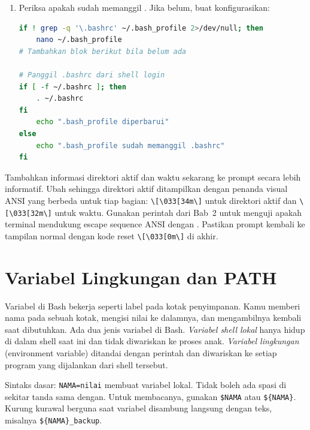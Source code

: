 \begin{enumerate}
    \item Periksa apakah  sudah memanggil
          . Jika belum, buat konfigurasikan:
\begin{lstlisting}[language=bash, caption={Memastikan .bash\_profile memanggil .bashrc}]
if ! grep -q '\.bashrc' ~/.bash_profile 2>/dev/null; then
    nano ~/.bash_profile
# Tambahkan blok berikut bila belum ada

# Panggil .bashrc dari shell login
if [ -f ~/.bashrc ]; then
    . ~/.bashrc
fi
    echo ".bash_profile diperbarui"
else
    echo ".bash_profile sudah memanggil .bashrc"
fi
\end{lstlisting}
\end{enumerate}

\begin{challengebox}
Tambahkan informasi direktori aktif dan waktu sekarang ke prompt secara
lebih informatif. Ubah  sehingga direktori aktif ditampilkan
dengan penanda visual ANSI yang berbeda untuk tiap bagian:
\texttt{\textbackslash[\textbackslash 033[34m\textbackslash]} untuk direktori aktif
dan \texttt{\textbackslash[\textbackslash 033[32m\textbackslash]} untuk
waktu. Gunakan perintah  dari Bab~2 untuk menguji apakah
terminal mendukung escape sequence ANSI dengan \cmd{echo -e \textbackslash
033[32mTes\textbackslash033[0m}. Pastikan prompt kembali ke tampilan normal
dengan kode reset \texttt{\textbackslash[\textbackslash033[0m\textbackslash]}
di akhir.
\end{challengebox}

\section{Variabel Lingkungan dan PATH}
\label{sec:variabel-lingkungan-path}

Variabel di Bash bekerja seperti label pada kotak penyimpanan. Kamu
memberi nama pada sebuah kotak, mengisi nilai ke dalamnya, dan
mengambilnya kembali saat dibutuhkan. Ada dua jenis variabel di Bash.
\textit{Variabel shell lokal} hanya hidup di dalam shell saat ini dan
tidak diwariskan ke proses anak. \textit{Variabel lingkungan} (environment
variable) ditandai dengan perintah  dan diwariskan ke setiap
program yang dijalankan dari shell tersebut.

Sintaks dasar: \texttt{NAMA=nilai} membuat variabel lokal. Tidak boleh ada
spasi di sekitar tanda sama dengan. Untuk membacanya, gunakan
\texttt{\$NAMA} atau \texttt{\$\{NAMA\}}. Kurung kurawal berguna saat
variabel disambung langsung dengan teks, misalnya
\texttt{\$\{NAMA\}\_backup}.

